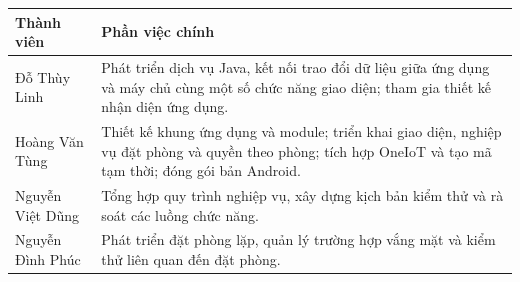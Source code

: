 \documentclass[../DoAn.tex]{subfiles}
\begin{document}
\begin{table}[H]
\centering
\small
\renewcommand{\arraystretch}{1.2}

\begin{tabularx}{\textwidth}{
    >{\raggedright\arraybackslash}p{3.8cm}
    >{\raggedright\arraybackslash}X
}
\toprule
\textbf{Thành viên} & \textbf{Phần việc chính} \\
\midrule
Đỗ Thùy Linh &
Phát triển dịch vụ Java, kết nối trao đổi dữ liệu giữa ứng dụng và máy chủ cùng một số chức năng giao diện; tham gia thiết kế nhận diện ứng dụng. \\
Hoàng Văn Tùng &
Thiết kế khung ứng dụng và module; triển khai giao diện, nghiệp vụ đặt phòng và quyền theo phòng; tích hợp OneIoT và tạo mã tạm thời; đóng gói bản Android. \\
Nguyễn Việt Dũng &
Tổng hợp quy trình nghiệp vụ, xây dựng kịch bản kiểm thử và rà soát các luồng chức năng. \\
Nguyễn Đình Phúc &
Phát triển đặt phòng lặp, quản lý trường hợp vắng mặt và kiểm thử liên quan đến đặt phòng. \\
\bottomrule
\end{tabularx}
\end{table}
\end{document}
